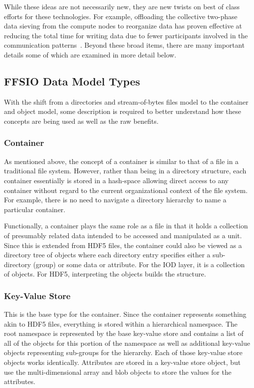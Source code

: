 \documentclass[conference]{IEEEtran} \pdfpagewidth=8.5in
\begin{document}
While these ideas are not necessarily new, they are new twists on best of class
efforts for these technologies. For example, offloading the collective
two-phase data sieving from the compute nodes to reorganize data has proven
effective at reducing the total time for writing data due to fewer participants
involved in the communication patterns~\cite{lofstead:2011:nessie-staging}.
Beyond these broad items, there are many important details some of which are
examined in more detail below.

\subsection{FFSIO Data Model Types}
\label{sec:data-model}

With the shift from a directories and stream-of-bytes files model to the
container and object model, some description is required to better understand
how these concepts are being used as well as the raw benefits.

\subsubsection{Container}
As mentioned above, the concept of a container is similar to that of a file in
a traditional file system. However, rather than being in a directory structure,
each container essentially is stored in a hash-space allowing direct access to
any container without regard to the current organizational context of the
file system. For example, there is no need to navigate a directory hierarchy
to name a particular container.

Functionally, a container plays the same role as a file in that it holds a
collection of presumably related data intended to be accessed and manipulated
as a unit. Since this is extended from HDF5 files, the container could also be
viewed as a directory tree of objects where each directory entry specifies
either a sub-directory (group) or some data or attribute. For the IOD layer, it
is a collection of objects. For HDF5, interpreting the objects builds the
structure.

\subsubsection{Key-Value Store}
This is the base type for the container. Since the container represents
something akin to HDF5 files, everything is stored within a hierarchical
namespace. The root namespace is represented by the base key-value store and
contains a list of all of the objects for this portion of the namespace as well
as additional key-value objects representing sub-groups for the hierarchy. Each
of those key-value store objects works identically.  Attributes are stored in a
key-value store object, but use the
multi-dimensional array and blob objects to store the values for the
attributes.
\end{document}
